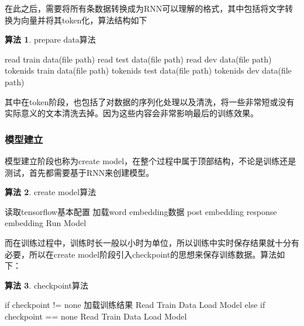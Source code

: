 \documentclass[supercite]{HustGraduPaper}
\theoremstyle{definition}
\newtheorem{alg}{算法}[section]
\begin{document}
在此之后，需要将所有条数据转换成为RNN可以理解的格式，其中包括将文字转换为向量并将其token化，算法结构如下

\begin{shaded*}
  \begin{alg}{prepare data算法}
  \label{alg:ppd}
  \begin{algorithmic}
    \State read train data(file path)
    \State read test data(file path)
    \State read dev data(file path)
    \State tokenids train data(file path)
    \State tokenids test data(file path)
    \State tokenids dev data(file path)
  \end{algorithmic}
  \end{alg}
\end{shaded*}

其中在token阶段，也包括了对数据的序列化处理以及清洗，将一些非常短或没有实际意义的文本清洗去掉。因为这些内容会非常影响最后的训练效果。

\subsubsection{模型建立}
模型建立阶段也称为create model，在整个过程中属于顶部结构，不论是训练还是测试，首先都需要基于RNN来创建模型。
\begin{shaded*}
  \begin{alg}{create model算法}
  \label{alg:cm}
  \begin{algorithmic}
    \State 读取tensorflow基本配置
    \State 加载word embedding数据
    \State post embedding
    \State response embedding
    \State Run Model
  \end{algorithmic}
  \end{alg}
\end{shaded*}

而在训练过程中，训练时长一般以小时为单位，所以训练中实时保存结果就十分有必要，所以在create model阶段引入checkpoint的思想来保存训练数据。算法如下：

\begin{shaded*}
  \begin{alg}{checkpoint算法}
  \label{alg:cp}
  \begin{algorithmic}
      \State if checkpoint != none
      \State 加载训练结果
      \State Read Train Data
      \State Load Model
      \State else if checkpoint == none
      \State Read Train Data
      \State Load Model
  \end{algorithmic}
  \end{alg}
\end{shaded*}
\end{document}
